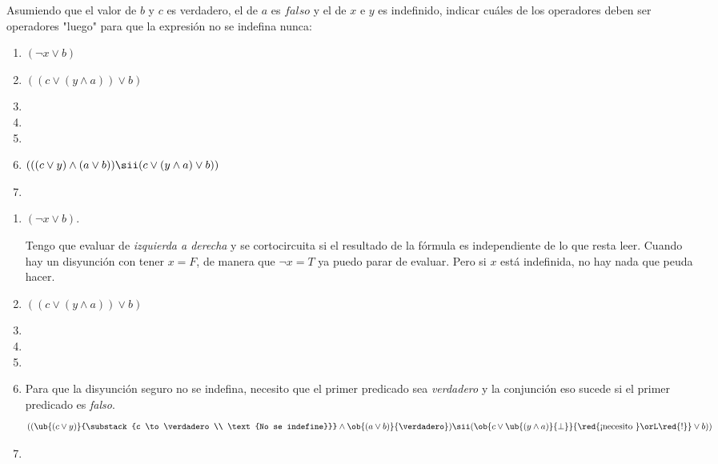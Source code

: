 \begin{enunciado}{\ejercicio}
  Asumiendo que el valor de $b$ y $c$ es verdadero, el de $a$ es $falso$ y el de $x$ e $y$ es indefinido, indicar cuáles de los operadores
  deben ser operadores "luego" para que la expresión no se indefina nunca:\par
  \begin{enumerate}[label=\alph*)]
    \item $(\neg x \lor b)$
    \item $((c \lor (y \land a)) \lor b)$
    \item
    \item
    \item
    \item $(((c \lor y) \land (a \lor b)) \sii (c \lor (y \land a) \lor b))$
    \item
  \end{enumerate}
\end{enunciado}

\begin{enumerate}[label=\alph*)]
  \item $(\neg x \lor b)$.\par
        Tengo que evaluar de \textit{izquierda a derecha} y se cortocircuita si el resultado de la fórmula es independiente de lo que resta leer.
        Cuando hay un disyunción con tener $x = F$, de manera que $\neg x = T$ ya puedo parar de evaluar. Pero si $x$ está indefinida, no hay nada que
        peuda hacer.

  \item $((c \lor (y \land a)) \lor b)$
  \item
  \item
  \item
  \item
        Para que la disyunción seguro no se indefina, necesito que el primer predicado sea \textit{verdadero} y la conjunción eso sucede si el primer predicado
        es \textit{falso}.
        $$
          ((\ub{(c \lor y)}{\substack{c \to \verdadero \\ \text{No se indefine}}}
          \land
          \ob{(a \lor b)}{\verdadero})
          \sii
          (\ob{c \lor \ub{(y \land a)}{\perp}}{\text{\red{¡necesito }}\orL \red{!}} \lor b))
        $$
  \item
\end{enumerate}
